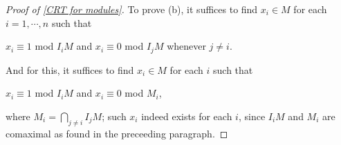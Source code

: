 \begin{proof}[Proof of \cref{CRT for modules}]
    To prove (b), it suffices to find $x_i\in M$ for each $i=1, \cdots, n$ such that
    \begin{center}
        $x_i\equiv 1$ mod $I_iM$ and $x_i\equiv 0$ mod $I_jM$ whenever $j\neq i$.
    \end{center}
    And for this, it suffices to find $x_i\in M$ for each $i$ such that
    \begin{center}
        $x_i\equiv 1$ mod $I_iM$ and $x_i\equiv 0$ mod $M_i$,
    \end{center}
    where $M_i=\bigcap_{j\neq i} I_jM$; such $x_i$ indeed exists for each $i$, since $I_iM$ and $M_i$ are comaximal as found in the preceeding paragraph.
\end{proof}